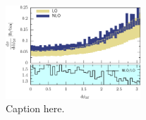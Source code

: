 \documentclass[preprint]{JHEP3} %
\begin{document}
\begin{figure}[h]
\centering %
\includegraphics[width=0.45\textwidth]{./LHC_53_Fig19.eps}
\caption{\label{fig:i} Caption here.}
\end{figure}






\end{document}
